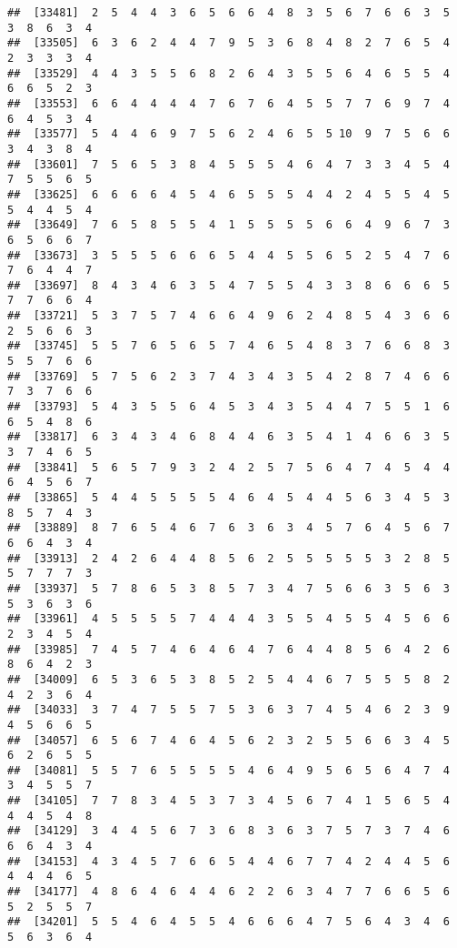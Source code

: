 \documentclass[
]{book}
\begin{document}
\begin{verbatim}
##  [33481]  2  5  4  4  3  6  5  6  6  4  8  3  5  6  7  6  6  3  5  3  8  6  3  4
##  [33505]  6  3  6  2  4  4  7  9  5  3  6  8  4  8  2  7  6  5  4  2  3  3  3  4
##  [33529]  4  4  3  5  5  6  8  2  6  4  3  5  5  6  4  6  5  5  4  6  6  5  2  3
##  [33553]  6  6  4  4  4  4  7  6  7  6  4  5  5  7  7  6  9  7  4  6  4  5  3  4
##  [33577]  5  4  4  6  9  7  5  6  2  4  6  5  5 10  9  7  5  6  6  3  4  3  8  4
##  [33601]  7  5  6  5  3  8  4  5  5  5  4  6  4  7  3  3  4  5  4  7  5  5  6  5
##  [33625]  6  6  6  6  4  5  4  6  5  5  5  4  4  2  4  5  5  4  5  5  4  4  5  4
##  [33649]  7  6  5  8  5  5  4  1  5  5  5  5  6  6  4  9  6  7  3  6  5  6  6  7
##  [33673]  3  5  5  5  6  6  6  5  4  4  5  5  6  5  2  5  4  7  6  7  6  4  4  7
##  [33697]  8  4  3  4  6  3  5  4  7  5  5  4  3  3  8  6  6  6  5  7  7  6  6  4
##  [33721]  5  3  7  5  7  4  6  6  4  9  6  2  4  8  5  4  3  6  6  2  5  6  6  3
##  [33745]  5  5  7  6  5  6  5  7  4  6  5  4  8  3  7  6  6  8  3  5  5  7  6  6
##  [33769]  5  7  5  6  2  3  7  4  3  4  3  5  4  2  8  7  4  6  6  7  3  7  6  6
##  [33793]  5  4  3  5  5  6  4  5  3  4  3  5  4  4  7  5  5  1  6  6  5  4  8  6
##  [33817]  6  3  4  3  4  6  8  4  4  6  3  5  4  1  4  6  6  3  5  3  7  4  6  5
##  [33841]  5  6  5  7  9  3  2  4  2  5  7  5  6  4  7  4  5  4  4  6  4  5  6  7
##  [33865]  5  4  4  5  5  5  5  4  6  4  5  4  4  5  6  3  4  5  3  8  5  7  4  3
##  [33889]  8  7  6  5  4  6  7  6  3  6  3  4  5  7  6  4  5  6  7  6  6  4  3  4
##  [33913]  2  4  2  6  4  4  8  5  6  2  5  5  5  5  5  3  2  8  5  5  7  7  7  3
##  [33937]  5  7  8  6  5  3  8  5  7  3  4  7  5  6  6  3  5  6  3  5  3  6  3  6
##  [33961]  4  5  5  5  5  7  4  4  4  3  5  5  4  5  5  4  5  6  6  2  3  4  5  4
##  [33985]  7  4  5  7  4  6  4  6  4  7  6  4  4  8  5  6  4  2  6  8  6  4  2  3
##  [34009]  6  5  3  6  5  3  8  5  2  5  4  4  6  7  5  5  5  8  2  4  2  3  6  4
##  [34033]  3  7  4  7  5  5  7  5  3  6  3  7  4  5  4  6  2  3  9  4  5  6  6  5
##  [34057]  6  5  6  7  4  6  4  5  6  2  3  2  5  5  6  6  3  4  5  6  2  6  5  5
##  [34081]  5  5  7  6  5  5  5  5  4  6  4  9  5  6  5  6  4  7  4  3  4  5  5  7
##  [34105]  7  7  8  3  4  5  3  7  3  4  5  6  7  4  1  5  6  5  4  4  4  5  4  8
##  [34129]  3  4  4  5  6  7  3  6  8  3  6  3  7  5  7  3  7  4  6  6  6  4  3  4
##  [34153]  4  3  4  5  7  6  6  5  4  4  6  7  7  4  2  4  4  5  6  4  4  4  6  5
##  [34177]  4  8  6  4  6  4  4  6  2  2  6  3  4  7  7  6  6  5  6  5  2  5  5  7
##  [34201]  5  5  4  6  4  5  5  4  6  6  6  4  7  5  6  4  3  4  6  5  6  3  6  4

\end{verbatim}
\end{document}
